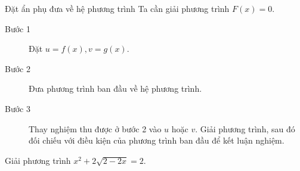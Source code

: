 \begin{dang}{Đặt ẩn phụ đưa về  hệ phương trình }	
Ta cần giải phương trình $ F(x)=0 $.	
		\begin{description}
			\item[Bước 1] Đặt $ u=f(x), v=g(x)$.
			\item[Bước 2] Đưa phương trình ban đầu về hệ phương trình.
			\item[Bước 3] Thay nghiệm thu được ở bước 2 vào $ u $ hoặc $ v $. Giải phương trình, sau đó đối  chiếu với điều kiện của phương trình ban đầu để kết luận nghiệm.
		\end{description}	
\end{dang}

\begin{bt}%
	Giải phương trình $ x^2+2\sqrt{2-2x}=2. $
\end{bt}

